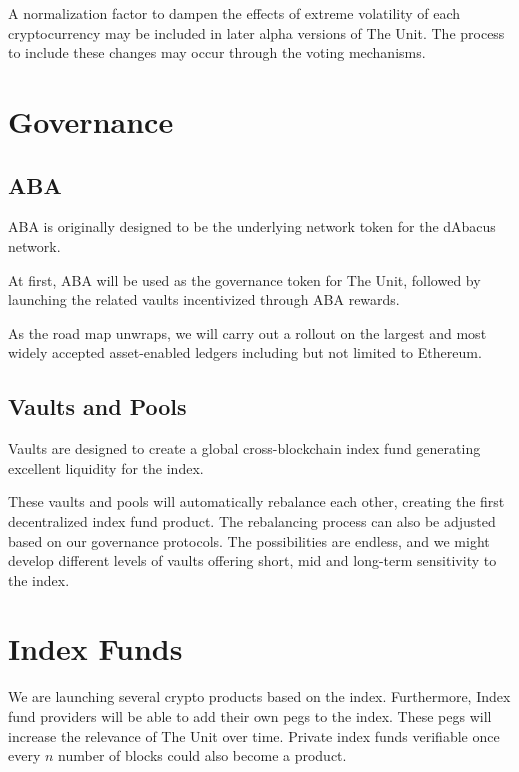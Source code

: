 \documentclass[12pt]{article}
\begin{document}
A normalization factor to dampen the effects of extreme volatility of each cryptocurrency may be included in later alpha versions of The Unit. The process to include these changes may occur through the voting mechanisms. 

\section{Governance}

\subsection{ABA}



ABA is originally designed to be the underlying network token for the dAbacus network. 

At first, ABA will be used as the governance token for The Unit, followed by launching the related vaults incentivized through ABA rewards. 

As the road map unwraps, we will carry out a rollout on the largest and most widely accepted asset-enabled ledgers including but not limited to Ethereum.


\subsection{Vaults and Pools}

Vaults are designed to create a global cross-blockchain index fund generating excellent liquidity for the index. 

These vaults and pools will automatically rebalance each other, creating the first decentralized index fund product. The rebalancing process can also be adjusted based on our governance protocols. The possibilities are endless, and we might develop different levels of vaults offering short, mid and long-term sensitivity to the index. 

\section{Index Funds}

We are launching several crypto products based on the index. Furthermore, Index fund providers will be able to add their own pegs to the index. These pegs will increase the relevance of The Unit over time. Private index funds verifiable once every $n$ number of blocks could also become a product. 
\end{document}
